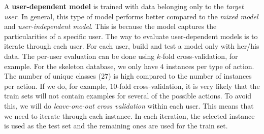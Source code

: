 \documentclass[
  11pt,
]{krantz}
\begin{document}
A \textbf{user-dependent model} is trained with data belonging only to the \emph{target user}. In general, this type of model performs better compared to the \emph{mixed model} and \emph{user-independent model}. This is because the model captures the particularities of a specific user. The way to evaluate user-dependent models is to iterate through each user. For each user, build and test a model only with her/his data. The per-user evaluation can be done using \(k\)-fold cross-validation, for example. For the skeleton database, we only have \(4\) instances per type of action. The number of unique classes (\(27\)) is high compared to the number of instances per action. If we do, for example, \(10\)-fold cross-validation, it is very likely that the train sets will not contain examples for several of the possible actions. To avoid this, we will do \emph{leave-one-out cross validation} within each user. This means that we need to iterate through each instance. In each iteration, the selected instance is used as the test set and the remaining ones are used for the train set.
\end{document}
